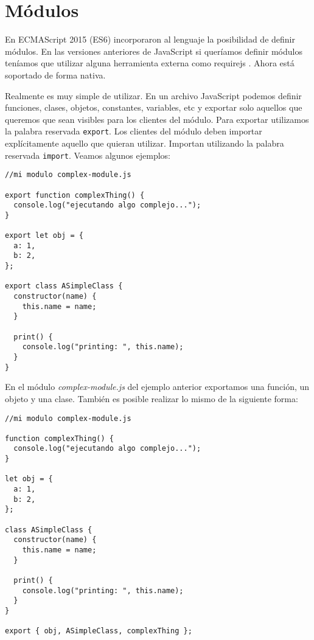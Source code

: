 \documentclass[a4paper, oneside, titlepage, 12pt]{paper}
\begin{document}
\section{Módulos}

En ECMAScript 2015 (ES6) incorporaron al lenguaje la posibilidad de definir módulos. En las versiones anteriores de JavaScript si queríamos definir módulos teníamos que utilizar alguna herramienta externa como requirejs \cite{requirejs}. Ahora está soportado de forma nativa. 
\newline

Realmente es muy simple de utilizar. En un archivo JavaScript podemos definir funciones, clases, objetos, constantes, variables, etc y exportar solo aquellos que queremos que sean visibles para los clientes del módulo. Para exportar utilizamos la palabra reservada \texttt{export}. Los clientes del módulo deben importar explícitamente aquello que quieran utilizar. Importan utilizando la palabra reservada \texttt{import}. Veamos algunos ejemplos:
 
\begin{verbatim}
//mi modulo complex-module.js

export function complexThing() {
  console.log("ejecutando algo complejo...");
}

export let obj = {
  a: 1,
  b: 2,
};

export class ASimpleClass {
  constructor(name) {
    this.name = name;
  }

  print() {
    console.log("printing: ", this.name);
  }
}
\end{verbatim}

En el módulo \textit{complex-module.js} del ejemplo anterior exportamos una función, un objeto y una clase. También es posible realizar lo mismo de la siguiente forma:

\begin{verbatim}
//mi modulo complex-module.js

function complexThing() {
  console.log("ejecutando algo complejo...");
}

let obj = {
  a: 1,
  b: 2,
};

class ASimpleClass {
  constructor(name) {
    this.name = name;
  }

  print() {
    console.log("printing: ", this.name);
  }
}

export { obj, ASimpleClass, complexThing };
\end{verbatim}
\end{document}
